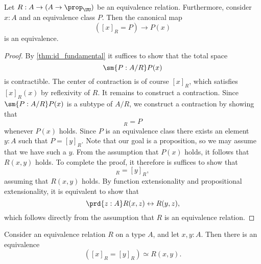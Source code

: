 \begin{prp}\label{prp:eq-quotient}
  Let $R:A\to (A\to\prop_\UU)$ be an equivalence relation. Furthermore, consider $x:A$ and an equivalence class $P$. Then the canonical map
  \begin{equation*}
    ([x]_R=P)\to P(x)
  \end{equation*}
  is an equivalence.
\end{prp}

\begin{proof}
  By \cref{thm:id_fundamental} it suffices to show that the total space
  \begin{equation*}
    \sm{P:A/R}P(x)
  \end{equation*}
  is contractible. The center of contraction is of course $[x]_R$, which satisfies $[x]_R(x)$ by reflexivity of $R$. It remains to construct a contraction. Since $\sm{P:A/R}P(x)$ is a subtype of $A/R$, we construct a contraction by showing that
  \begin{equation*}
    [x]_R=P
  \end{equation*}
  whenever $P(x)$ holds. Since $P$ is an equivalence class there exists an element $y:A$ such that $P=[y]_R$. Note that our goal is a proposition, so we may assume that we have such a $y$. From the assumption that $P(x)$ holds, it follows that $R(x,y)$ holds. To complete the proof, it therefore is suffices to show that
  \begin{equation*}
    [x]_R=[y]_R,
  \end{equation*}
  assuming that $R(x,y)$ holds. By function extensionality and propositional extensionality, it is equivalent to show that
  \begin{equation*}
    \prd{z:A}R(x,z)\leftrightarrow R(y,z),
  \end{equation*}
  which follows directly from the assumption that $R$ is an equivalence relation.
\end{proof}

\begin{cor}\label{cor:eq-quotient}
  Consider an equivalence relation $R$ on a type $A$, and let $x,y:A$. Then there is an equivalence
  \begin{equation*}
    ([x]_R=[y]_R)\simeq R(x,y).
  \end{equation*}
\end{cor}

